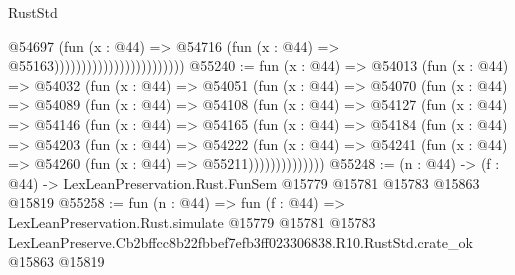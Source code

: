 \begin{lexlean}{RustStd}
\begin{coremodule}
                                              @54697
                                                (fun (x : @44) =>
                                                @54716
                                                  (fun (x : @44) => @55163))))))))))))))))))))))))
@55240 := fun (x : @44) =>
  @54013
    (fun (x : @44) =>
    @54032
      (fun (x : @44) =>
      @54051
        (fun (x : @44) =>
        @54070
          (fun (x : @44) =>
          @54089
            (fun (x : @44) =>
            @54108
              (fun (x : @44) =>
              @54127
                (fun (x : @44) =>
                @54146
                  (fun (x : @44) =>
                  @54165
                    (fun (x : @44) =>
                    @54184
                      (fun (x : @44) =>
                      @54203
                        (fun (x : @44) =>
                        @54222
                          (fun (x : @44) =>
                          @54241 (fun (x : @44) => @54260 (fun (x : @44) => @55211))))))))))))))
@55248 := (n : @44) ->
  (f : @44) -> LexLeanPreservation.Rust.FunSem @15779 @15781 @15783 @15863 @15819
@55258 := fun (n : @44) =>
  fun (f : @44) =>
  LexLeanPreservation.Rust.simulate
    @15779
    @15781
    @15783
    LexLeanPreserve.Cb2bffcc8b22fbbef7efb3ff023306838.R10.RustStd.crate_ok
    @15863
    @15819
\end{coremodule}
\end{lexlean}
